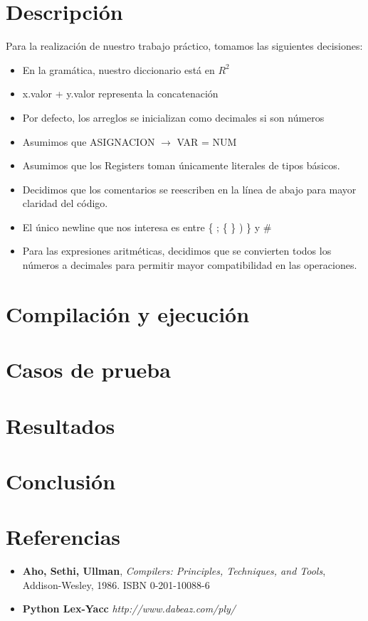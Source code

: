 \documentclass[10pt,a4paper]{article}
\begin{document}
\section{Descripción}

Para la realización de nuestro trabajo práctico, tomamos las siguientes decisiones:
\begin{itemize}
\item En la gramática, nuestro diccionario está en $R^2$ 

\item x.valor + y.valor representa la concatenación

\item Por defecto, los arreglos se inicializan como decimales si son números

\item Asumimos que ASIGNACION $\rightarrow$ VAR = NUM 

\item Asumimos que los Registers toman únicamente literales de tipos básicos.

\item Decidimos que los comentarios se reescriben en la línea de abajo para mayor claridad del código.

\item El único newline que nos interesa es entre \{ ; \{ \} ) \} y \#

\item Para las expresiones aritméticas, decidimos que se convierten todos los números a decimales para permitir mayor compatibilidad en las operaciones.
\end{itemize}


\section{Compilación y ejecución}

\section{Casos de prueba}

\section{Resultados}

\section{Conclusión}

\section{Referencias}
\begin{itemize}
\item \textbf{Aho, Sethi, Ullman}, \textit{Compilers: Principles, Techniques, and Tools}, Addison-Wesley, 1986. ISBN 0-201-10088-6

\item \textbf{Python Lex-Yacc} \textit{http://www.dabeaz.com/ply/}
\end{itemize}
\end{document}
